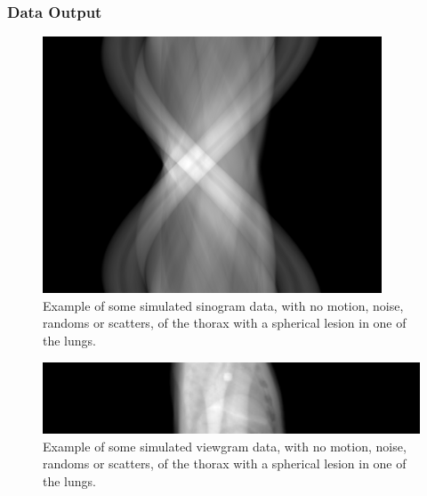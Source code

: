             \subsubsection{Data Output} \label{sec:data_output}
                \begin{figure}
                    \centering
                    
                    \includegraphics[width=1.0\linewidth]{figures/background_sinogram_data_example.png}
                    
                    \captionsetup{singlelinecheck=false}
                    \caption{
                        Example of some simulated sinogram data, with no motion, noise, randoms or scatters, of the thorax with a spherical lesion in one of the lungs.
                    }
                    \label{fig:data_output_sinogram_data_example}
                \end{figure}
                
                \begin{figure}
                    \centering
                    
                    \includegraphics[width=1.0\linewidth]{figures/background_viewgram_data_example.png}
                    
                    \captionsetup{singlelinecheck=false}
                    \caption{
                        Example of some simulated viewgram data, with no motion, noise, randoms or scatters, of the thorax with a spherical lesion in one of the lungs.
                    }
                    \label{fig:data_output_viewgram_data_example} %
                \end{figure}
                
